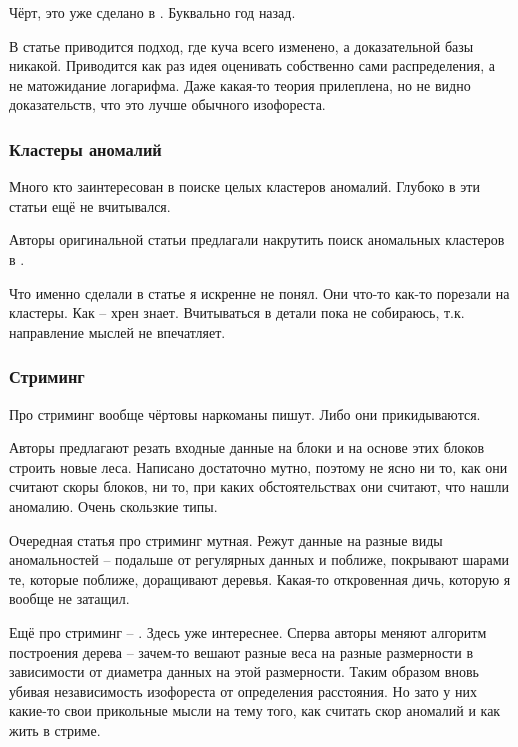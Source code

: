 \documentclass[12pt]{article}
\begin{document}
Чёрт, это уже сделано в
\cite{lesoupleGeneralizedIsolationForest2021}
. Буквально год назад.


В статье
\cite{wuRSForestRapidDensity2014}
приводится подход, где куча всего изменено, а доказательной базы никакой.
Приводится как раз идея оценивать собственно сами распределения, а не матожидание
логарифма. Даже какая-то теория прилеплена, но не видно доказательств, что это
лучше обычного изофореста.

\subsubsection*{Кластеры аномалий}

Много кто заинтересован в поиске целых кластеров аномалий. Глубоко в эти статьи
ещё не вчитывался.

Авторы оригинальной статьи предлагали накрутить поиск аномальных кластеров в
\cite{liuDetectingClusteredAnomalies2010}
. 

Что именно сделали в статье
\cite{karczmarekKMeansbasedIsolationForest2020}
я искренне не понял. Они что-то как-то порезали на кластеры. Как -- хрен знает.
Вчитываться в детали пока не собираюсь, т.к. направление мыслей не впечатляет.


\subsubsection*{Стриминг}

Про стриминг вообще чёртовы наркоманы пишут. Либо они прикидываются.

Авторы
\cite{dingAnomalyDetectionApproach2013}
предлагают резать входные данные на блоки и на основе этих блоков строить новые 
леса. Написано достаточно мутно, поэтому не ясно ни то, как они считают скоры
блоков, ни то, при каких обстоятельствах они считают, что нашли аномалию. Очень
скользкие типы.

Очередная статья про стриминг
\cite{muClassificationStreamingEmerging2017}
мутная. Режут данные на разные виды аномальностей -- подальше от регулярных
данных и поближе, покрывают шарами те, которые поближе, доращивают деревья.
Какая-то откровенная дичь, которую я вообще не затащил.

Ещё про стриминг --
\cite{guhaRobustRandomCut2016}
. Здесь уже интереснее. Сперва авторы меняют алгоритм построения дерева --
зачем-то вешают разные веса на разные размерности в зависимости от диаметра
данных на этой размерности. Таким образом вновь убивая независимость изофореста
от определения расстояния. Но зато у них какие-то свои прикольные мысли на тему того,
как считать скор аномалий и как жить в стриме.
\end{document}
